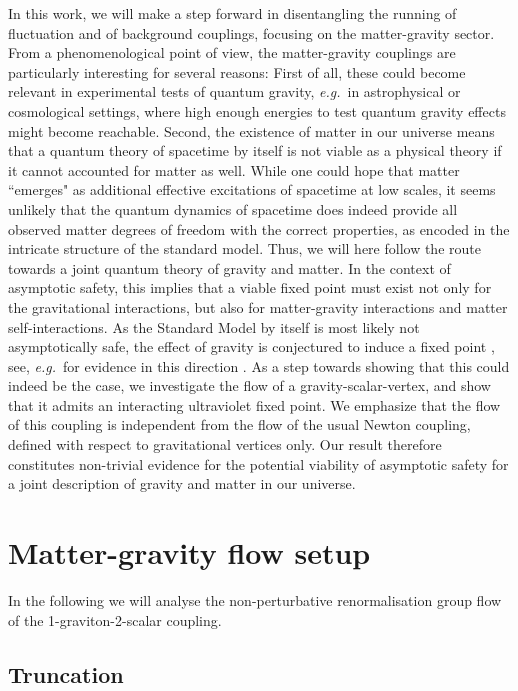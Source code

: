 \documentclass[11pt]{book} %
\newcommand\eg{\textit{e.g.}\ }
\numberwithin{equation}{chapter}
\begin{document}
In this work, we will make a step forward in disentangling the running of fluctuation and
of background couplings, focusing on the matter-gravity sector.
From a phenomenological point of view, the matter-gravity couplings are particularly interesting
for several reasons: First of all, these could become relevant in experimental tests of quantum gravity,
\eg in astrophysical or cosmological settings,
where high enough energies to test quantum gravity effects might become reachable.
Second, the existence of matter in our universe means that a quantum theory
of spacetime by itself is not viable as a physical theory if it cannot accounted for matter as well.
While one could hope that matter ``emerges" as additional effective excitations of spacetime at low scales,
it seems unlikely that the quantum dynamics of spacetime does indeed provide all observed matter
degrees of freedom with the correct properties, as encoded in the intricate structure of the standard model.
Thus, we will here follow the route towards a joint quantum theory of gravity and matter.
In the context of asymptotic safety, this implies that a viable fixed point must exist not only
for the gravitational interactions, but also for matter-gravity interactions and matter self-interactions.
As the Standard Model by itself is most likely not asymptotically safe, the effect of gravity
is conjectured to  induce a fixed point \cite{Shaposhnikov:2009pv},
see, \eg for evidence in this direction \cite{Zanusso:2009bs, Vacca:2010mj,
Harst:2011zx, Eichhorn:2011pc, Eichhorn:2012va,Oda:2015sma}.
As a step towards showing that this could indeed be the case,
we investigate the flow of a gravity-scalar-vertex,
and show that it admits an interacting ultraviolet fixed point.
We emphasize that the flow of this coupling is independent from the flow of the usual Newton coupling,
defined with respect to gravitational vertices only.
Our result therefore constitutes non-trivial evidence for the potential viability of asymptotic safety
for a joint description of gravity and matter in our universe.


\section{Matter-gravity flow setup}

In the following we will analyse the non-perturbative renormalisation group flow of the
1-graviton-2-scalar coupling.


\subsection{Truncation}
\end{document}
